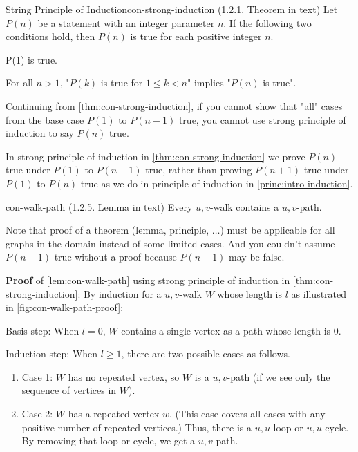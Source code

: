 \documentclass[../src/handouts/main.tex]{subfiles}
\begin{document}
\begin{theorem}{String Principle of Induction}{con-strong-induction}
  (1.2.1. Theorem in text)
  Let $P(n)$ be a statement with an integer parameter $n$.
  If the following two conditions hold, then $P(n)$ is true for each positive integer $n$.

  \begin{enumerate*}
    \item P(1) is true.
    \item For all $n > 1$, "$P(k)$ is true for $1 \leq k < n$" implies "$P(n)$ is true".
  \end{enumerate*}
\end{theorem}

Continuing from \cref{thm:con-strong-induction}, if you cannot show that "all" cases from the base case $P(1)$ to $P(n-1)$ true, you cannot use strong principle of induction to say $P(n)$ true.

In strong principle of induction in \cref{thm:con-strong-induction} we prove $P(n)$ true under $P(1)$ to $P(n - 1)$ true, rather than proving $P(n + 1)$ true under $P(1)$ to $P(n)$ true as we do in principle of induction in \cref{princ:intro-induction}.

\begin{lemma}{}{con-walk-path}
  (1.2.5. Lemma in text)
  Every $u,v$-walk contains a $u,v$-path.
\end{lemma}

Note that proof of a theorem (lemma, principle, $\ldots$) must be applicable for all graphs in the domain instead of some limited cases. And you couldn't assume $P(n - 1)$ true without a proof because $P(n - 1)$ may be false.

\textbf{Proof} of \cref{lem:con-walk-path} using strong principle of induction in \cref{thm:con-strong-induction}:
By induction for a $u,v$-walk $W$ whose length is $l$ as illustrated in \cref{fig:con-walk-path-proof}:
\begin{enumerate*}
  \item Basis step: When $l = 0$, $W$ contains a single vertex as a path whose length is 0.
  \item Induction step: When $l \geq 1$, there are two possible cases as follows.
        \begin{enumerate}
          \item Case 1: $W$ has no repeated vertex, so $W$ is a $u,v$-path (if we see only the sequence of vertices in $W$).
          \item Case 2: $W$ has a repeated vertex $w$. (This case covers all cases with any positive number of repeated vertices.) Thus, there is a $u,u$-loop or $u,u$-cycle. By removing that loop or cycle, we get a $u,v$-path.
        \end{enumerate}
\end{enumerate*}
\end{document}
